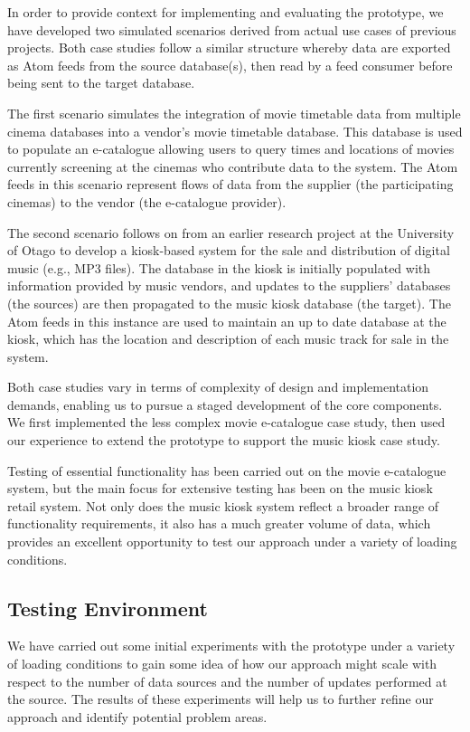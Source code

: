 \documentclass{CRPITStyle}
\begin{document}
In order to provide context for implementing and evaluating the
prototype, we have developed two simulated scenarios derived from actual
use cases of previous projects. Both case studies follow a similar
structure whereby data are exported as Atom feeds from the source
database(s), then read by a feed consumer before being sent to the
target database.

The first scenario simulates the integration of movie timetable data
from multiple cinema databases into a vendor's movie timetable database.
This database is used to populate an e-catalogue allowing users to query
times and locations of movies currently screening at the cinemas who
contribute data to the system. The Atom feeds in this scenario represent
flows of data from the supplier (the participating cinemas) to the
vendor (the e-catalogue provider).

The second scenario follows on from an earlier research project at the
University of Otago to develop a kiosk-based system for the sale and
distribution of digital music (e.g., MP3 files). The database in the
kiosk is initially populated with information provided by music vendors,
and updates to the suppliers' databases (the sources) are then
propagated to the music kiosk database (the target). The Atom feeds in
this instance are used to maintain an up to date database at the kiosk,
which has the location and description of each music track for sale in
the system.

Both case studies vary in terms of complexity of design and
implementation demands, enabling us to pursue a staged development of
the core components. We first implemented the less complex movie
e-catalogue case study, then used our experience to extend the prototype
to support the music kiosk case study.

Testing of essential functionality has been carried out on the movie
e-catalogue system, but the main focus for extensive testing has been on
the music kiosk retail system. Not only does the music kiosk system
reflect a broader range of functionality requirements, it also has a
much greater volume of data, which provides an excellent opportunity to
test our approach under a variety of loading conditions.


\subsection{Testing Environment}
\label{sec-testing}

We have carried out some initial experiments with the prototype under a
variety of loading conditions to gain some idea of how our approach
might scale with respect to the number of data sources and the number of
updates performed at the source. The results of these experiments will
help us to further refine our approach and identify potential problem
areas.
\end{document}
